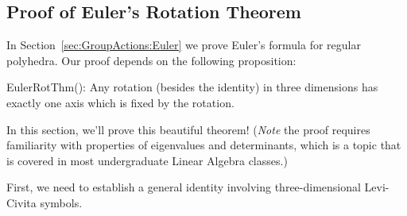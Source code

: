 \subsection{Proof of Euler's Rotation Theorem}
\label{subsec:SigmaApp:LeviCivitaAndApp:EulerRot}

In Section~\ref{sec:GroupActions:Euler} we prove Euler's formula for regular polyhedra. Our proof depends on the following proposition:

\begin{prop}{EulerRotThm}(): Any rotation (besides the identity) in three dimensions has exactly one axis which is fixed by the rotation.
\end{prop}

In this section, we'll prove this beautiful theorem!  (\emph{Note} the proof requires familiarity with properties of eigenvalues and determinants, which is a topic that is covered in most undergraduate Linear Algebra classes.)

First, we need to establish a general identity involving three-dimensional Levi-Civita symbols.

